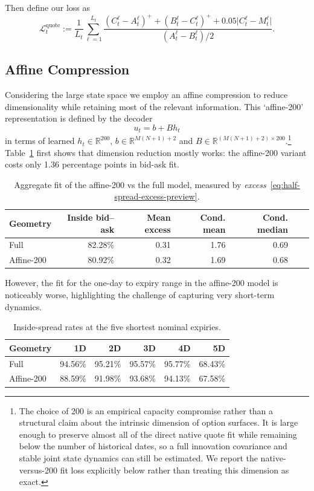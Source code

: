 \documentclass[11pt,a4paper]{article}
\newcommand{\R}{\mathbb{R}}
\DeclareRobustCommand{\eqlabel}[1]{\label{eq:#1}}                                     %
\DeclareRobustCommand{\eq}[1]{\begin{equation}\eqlabel{#1}}                           %
\DeclareRobustCommand{\eqend}{\end{equation}}                                         %
\begin{document}
Then define our loss as
\begin{equation}
  \mathcal L_t^{\mathrm{quote}}
  :=\frac{1}{L_t}\sum_{\ell=1}^{L_t}
    \frac{
      (C_t^\ell- A_t^\ell)^+
      +(B_t^\ell-C_t^\ell)^+
      +0.05\lvert C_t^\ell-M^\ell_t\rvert
    }{(A_t^\ell - B_t^\ell)/2}.
  \label{eq:production-quote-loss}
\end{equation}

\subsection{Affine Compression}

Considering the large state space we employ an affine compression to reduce dimensionality while retaining most of the relevant information.
This `affine-200' representation is defined by the decoder
\eq{affine-decoder-preview}
u_t=b+B h_t 
\eqend
in terms of learned $h_t\in\R^{200}$, $b\in\R^{M(N+1)+2}$ and
$B\in\R^{(M(N+1)+2)\times200}$.\footnote{
The choice of 200 is an empirical capacity compromise rather than a structural
claim about the intrinsic dimension of option surfaces.  It is large enough
to preserve almost all of the direct native quote fit while remaining below
the number of historical dates, so a full innovation covariance and stable
joint state dynamics can still be estimated.  We report the native-versus-200
fit loss explicitly below rather than treating this dimension as exact.
}
Table~\ref{tab:aggregate-fit-preview} first shows that dimension reduction mostly works: the affine-200 variant costs only 1.36 percentage points
in bid-ask fit.
\begin{table}[H]
\centering
\begin{tabular}{lrrrrrr}
\toprule
Geometry & Inside bid--ask
  & Mean excess & Cond. mean & Cond. median\\
\midrule
Full & 82.28\% & 0.31 & 1.76 & 0.69\\
Affine-200 & 80.92\% & 0.32 & 1.69 & 0.68\\
\bottomrule
\end{tabular}
\caption{Aggregate fit of the affine-200 vs the full model, measured by \emph{excess}~\eqref{eq:half-spread-excess-preview}.}
\label{tab:aggregate-fit-preview}
\end{table}

However, the fit for the one-day to expiry range in the affine-200 model is noticeably worse,
highlighting the challenge of capturing very short-term dynamics.
\begin{table}[H]
\centering
\begin{tabular}{lrrrrr}
\toprule
Geometry & 1D & 2D & 3D & 4D & 5D\\
\midrule
Full & 94.56\% & 95.21\% & 95.57\% & 95.77\% & 68.43\%\\
Affine-200 & {\color{red}88.59\%} & 91.98\% & 93.68\% & 94.13\% & 67.58\%\\
\bottomrule
\end{tabular}
\caption{Inside-spread rates at the five shortest nominal expiries.}
\label{tab:short-fit}
\end{table}
\end{document}
